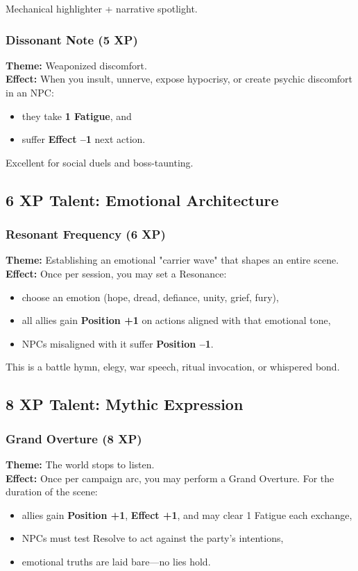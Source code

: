 \documentclass[11pt]{book}
\begin{document}
Mechanical highlighter + narrative spotlight.

\subsubsection{Dissonant Note (5 XP)}
\textbf{Theme:} Weaponized discomfort.\\
\textbf{Effect:} When you insult, unnerve, expose hypocrisy,
or create psychic discomfort in an NPC:
\begin{itemize}
  \item they take \textbf{1 Fatigue}, and
  \item suffer \textbf{Effect --1} next action.
\end{itemize}

Excellent for social duels and boss-taunting.

\subsection{6 XP Talent: Emotional Architecture}

\subsubsection{Resonant Frequency (6 XP)}
\textbf{Theme:} Establishing an emotional "carrier wave" that shapes an entire scene.\\
\textbf{Effect:} Once per session, you may set a Resonance:
\begin{itemize}
  \item choose an emotion (hope, dread, defiance, unity, grief, fury),
  \item all allies gain \textbf{Position +1} on actions aligned with that emotional tone,
  \item NPCs misaligned with it suffer \textbf{Position --1}.
\end{itemize}

This is a battle hymn, elegy, war speech, ritual invocation, or whispered bond.

\subsection{8 XP Talent: Mythic Expression}

\subsubsection{Grand Overture (8 XP)}
\textbf{Theme:} The world stops to listen.\\
\textbf{Effect:} Once per campaign arc, you may perform a Grand Overture.
For the duration of the scene:
\begin{itemize}
  \item allies gain \textbf{Position +1}, \textbf{Effect +1},
        and may clear 1 Fatigue each exchange,
  \item NPCs must test Resolve to act against the party's intentions,
  \item emotional truths are laid bare---no lies hold.
\end{itemize}
\end{document}
